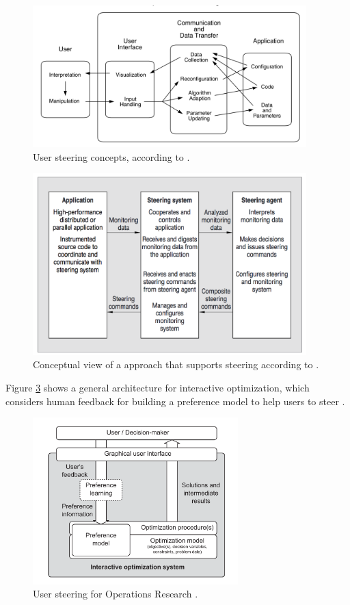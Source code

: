 \begin{figure}[H]
    \centering
    \includegraphics[width=400px,keepaspectratio]{img/media/image12.png}
    \caption{User steering concepts, according to
\citet{MulderSurvey}.}
    \label{fig:fig3_2}
\end{figure}

\begin{figure}[H]
    \centering
    \includegraphics[width=400px,keepaspectratio]{img/media/image14.png}
    \caption{Conceptual view of a approach that supports steering according to \citet{MulderSurvey}.}
    \label{fig:fig3_4}
\end{figure}



\noindent Figure \ref{fig:fig3_3} shows a general architecture for
interactive optimization, which considers human feedback for building a
preference model to help users to steer
\cite{Meignan2015Review}.

\begin{figure}[H]
    \centering
    \includegraphics[width=300px,keepaspectratio]{img/media/image13.png}
    \caption{User steering for Operations Research
\cite{Meignan2015Review}.}
    \label{fig:fig3_3}
\end{figure}


